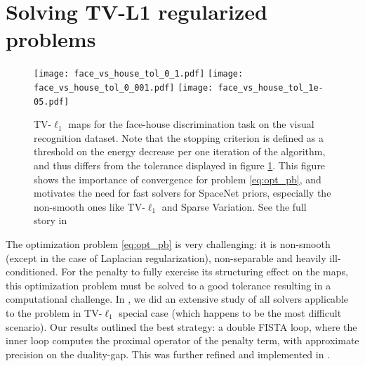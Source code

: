 \section{Solving TV-L1 regularized problems}
\begin{figure}[!htb]
    \texttt{[image: face\_vs\_house\_tol\_0\_1.pdf]}%
\hfill%
\texttt{[image: face\_vs\_house\_tol\_0\_001.pdf]}%
\hfill%
\texttt{[image: face\_vs\_house\_tol\_1e-05.pdf]}%
%

\caption{TV-$\ell_1$ maps for the face-house discrimination task on
  the visual recognition dataset.
  Note that
  the stopping criterion is defined as a threshold on the energy
  decrease per one iteration of the algorithm, and thus differs from
  the tolerance displayed in figure \ref{Fig:benchmarks_prni}.  This figure shows
  the importance of convergence for problem \eqref{eq:opt_pb}, and motivates
  the need for fast solvers for SpaceNet priors, especially the non-smooth ones like TV-$\ell_1$ and Sparse Variation. See the full story in
  \citep{dohmatob2014benchmarking}}
  \label{Fig:benchmarks_prni}
\end{figure}
The optimization problem \eqref{eq:opt_pb} is very challenging:
it is non-smooth (except in the case of Laplacian regularization), non-separable and heavily ill-conditioned. For the penalty to fully exercise its
structuring effect on the maps, this optimization problem must be
solved to a good tolerance resulting in a computational challenge.
In \citep{dohmatob2014benchmarking}, we did an extensive study of all solvers applicable to the problem in TV-$\ell_1$ special case (which happens to be the most difficult scenario).
Our results outlined the best strategy: a double FISTA loop, where the
inner loop computes the proximal operator of the penalty term, with approximate precision on the duality-gap. This was further refined and implemented in   \citep{varoquaux2015faasta}.


